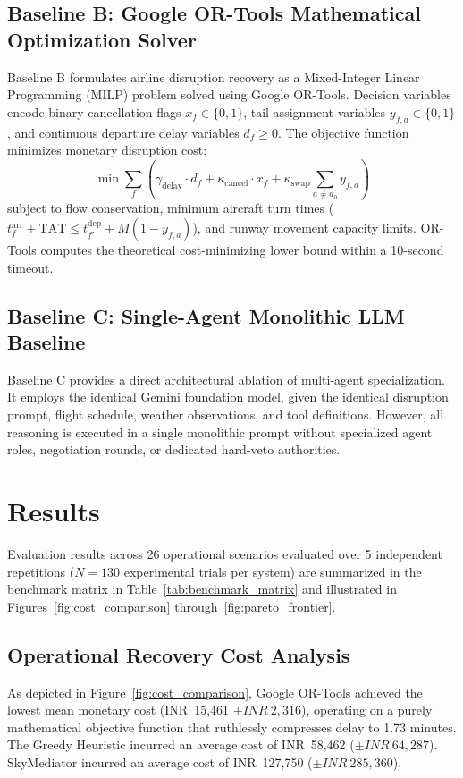 \subsection{Baseline B: Google OR-Tools Mathematical Optimization Solver}
Baseline B formulates airline disruption recovery as a Mixed-Integer Linear Programming (MILP) problem solved using Google OR-Tools. Decision variables encode binary cancellation flags $x_{f} \in \{0, 1\}$, tail assignment variables $y_{f, a} \in \{0, 1\}$, and continuous departure delay variables $d_f \ge 0$. The objective function minimizes monetary disruption cost:
\begin{equation}
    \min \sum_{f} \left( \gamma_{\text{delay}} \cdot d_f + \kappa_{\text{cancel}} \cdot x_f + \kappa_{\text{swap}} \sum_{a \ne a_0} y_{f, a} \right)
\end{equation}
subject to flow conservation, minimum aircraft turn times ($t^{\text{arr}}_f + \text{TAT} \le t^{\text{dep}}_{f'} + M(1 - y_{f, a})$), and runway movement capacity limits. OR-Tools computes the theoretical cost-minimizing lower bound within a 10-second timeout.

\subsection{Baseline C: Single-Agent Monolithic LLM Baseline}
Baseline C provides a direct architectural ablation of multi-agent specialization. It employs the identical Gemini foundation model, given the identical disruption prompt, flight schedule, weather observations, and tool definitions. However, all reasoning is executed in a single monolithic prompt without specialized agent roles, negotiation rounds, or dedicated hard-veto authorities.

\section{Results}
\label{sec:results}

Evaluation results across 26 operational scenarios evaluated over 5 independent repetitions ($N=130$ experimental trials per system) are summarized in the benchmark matrix in Table~\ref{tab:benchmark_matrix} and illustrated in Figures~\ref{fig:cost_comparison} through~\ref{fig:pareto_frontier}.

\subsection{Operational Recovery Cost Analysis}
As depicted in Figure~\ref{fig:cost_comparison}, Google OR-Tools achieved the lowest mean monetary cost (INR~15,461 $\pm INR~2,316$), operating on a purely mathematical objective function that ruthlessly compresses delay to 1.73 minutes. The Greedy Heuristic incurred an average cost of INR~58,462 ($\pm INR~64,287$). SkyMediator incurred an average cost of INR~127,750 ($\pm INR~285,360$).

